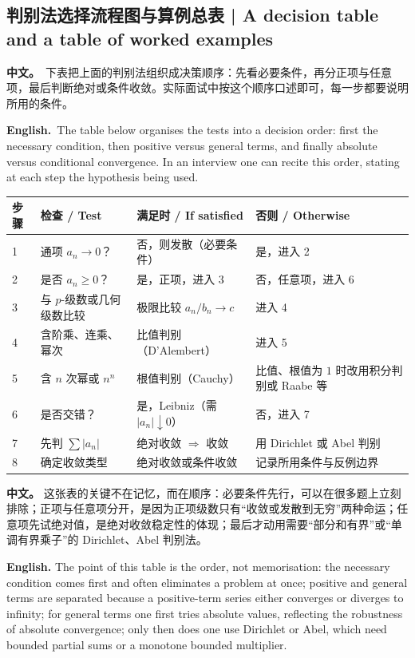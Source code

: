 \documentclass[UTF8,11pt,a4paper]{ctexart}
\newcommand{\BOTH}[2]{\par\noindent\textbf{中文。}\ #1\par\noindent\textbf{English.}\ #2\par}
\newcommand{\APS}[2]{\par\noindent\textbf{中文。} #1\par\noindent\textbf{English.} #2\par\smallskip}
\begin{document}
\subsection{判别法选择流程图与算例总表 | A decision table and a table of worked examples}
\BOTH{下表把上面的判别法组织成决策顺序：先看必要条件，再分正项与任意项，最后判断绝对或条件收敛。实际面试中按这个顺序口述即可，每一步都要说明所用的条件。}{The table below organises the tests into a decision order: first the necessary condition, then positive versus general terms, and finally absolute versus conditional convergence. In an interview one can recite this order, stating at each step the hypothesis being used.}
\begin{center}\small
\begin{tabular}{@{}p{1.2cm}p{4.7cm}p{4.7cm}p{4.5cm}@{}}
\toprule
\textbf{步骤} & \textbf{检查 / Test} & \textbf{满足时 / If satisfied} & \textbf{否则 / Otherwise}\\
\midrule
1 & 通项 $a_n\to0$？ & 否，则发散（必要条件） & 是，进入 2\\
2 & 是否 $a_n\ge0$？ & 是，正项，进入 3 & 否，任意项，进入 6\\
3 & 与 $p$-级数或几何级数比较 & 极限比较 $a_n/b_n\to c$ & 进入 4\\
4 & 含阶乘、连乘、幂次 & 比值判别（D'Alembert） & 进入 5\\
5 & 含 $n$ 次幂或 $n^n$ & 根值判别（Cauchy） & 比值、根值为 $1$ 时改用积分判别或 Raabe 等\\
6 & 是否交错？ & 是，Leibniz（需 $|a_n|\downarrow0$） & 否，进入 7\\
7 & 先判 $\sum|a_n|$ & 绝对收敛 $\Rightarrow$ 收敛 & 用 Dirichlet 或 Abel 判别\\
8 & 确定收敛类型 & 绝对收敛或条件收敛 & 记录所用条件与反例边界\\
\bottomrule
\end{tabular}
\end{center}
\APS{这张表的关键不在记忆，而在顺序：必要条件先行，可以在很多题上立刻排除；正项与任意项分开，是因为正项级数只有“收敛或发散到无穷”两种命运；任意项先试绝对值，是绝对收敛稳定性的体现；最后才动用需要“部分和有界”或“单调有界乘子”的 Dirichlet、Abel 判别法。}{The point of this table is the order, not memorisation: the necessary condition comes first and often eliminates a problem at once; positive and general terms are separated because a positive-term series either converges or diverges to infinity; for general terms one first tries absolute values, reflecting the robustness of absolute convergence; only then does one use Dirichlet or Abel, which need bounded partial sums or a monotone bounded multiplier.}
\end{document}
